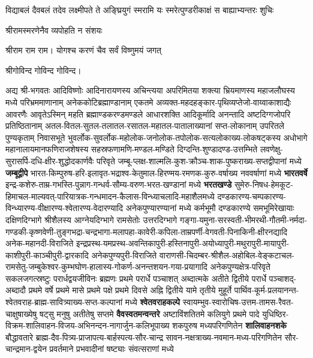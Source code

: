       {विद्याबलं दैवबलं तदेव लक्ष्मीपते ते अङ्घ्रियुगं स्मरामि}
    {यः स्मरेत्पुण्डरीकाक्षं स बाह्याभ्यन्तरः शुचिः}

{श्रीरामस्मरणेनैव व्यपोहति न संशयः}

श्रीराम राम राम। 
{योगश्च करणं चैव सर्वं विष्णुमयं जगत्}

श्रीगोविन्द गोविन्द गोविन्द। 

अद्य श्री-भगवतः आदिविष्णोः आदिनारायणस्य अचिन्त्यया अपरिमितया शक्त्या भ्रियमाणस्य महाजलौघस्य मध्ये
परिभ्रम\-माणानाम् अनेक\-कोटि\-ब्रह्माण्डानाम् एकतमे अव्यक्त-महदहङ्कार-पृथिव्यप्तेजो-वाय्वाकाशाद्यैः आवरणैः
आवृते\-ऽस्मिन् महति ब्रह्माण्डकरण्डमण्डले आधारशक्ति आदिकूर्मादि अनन्तादि अष्टदिग्गजोपरि
प्रतिष्ठितानाम् अतल-वितल-सुतल-तलातल-रसातल-महातल-पातालाख्यानां सप्त-लोकानाम् उपरितले
पुण्यकृताम् निवासभूते
भुवर्लोक-सुवर्लोक-महोलोक-जनोलोक-तपोलोक-सत्यलोकाख्य-लोकषट्कस्य अधोभागे महानालायमान\-फणि\-राज\-शेषस्य 
सहस्र\-फणामणि-मण्डल-मण्डिते दिग्दन्ति-शुण्डादण्ड-उत्तम्भिते 
लवणेक्षु-सुरासर्पि-दधि-क्षीर-शुद्धोदकार्णवैः परिवृते
जम्बू-प्लक्ष-शाल्मलि-कुश-क्रौञ्च-शाक-पुष्कराख्य-सप्तद्वीपानां मध्ये \textbf{जम्बूद्वीपे}
भारत-किम्पुरुष-हरि-इलावृत-भद्राश्व-केतुमाल-हिरण्मय-रमणक-कुरु-वर्षाख्य नववर्षाणां मध्ये \textbf{भारतवर्षे}
इन्द्र-कशेरु-ताम्र-गभस्ति-पुन्नाग-गन्धर्व-सौम्य-वरुण-भरत-खण्डानां मध्ये \textbf{भरतखण्डे}
सुमेरु-निषध-हेमकूट-हिमाचल-माल्यवत्-पारियात्रक-गन्धमादन-कैलास-विन्ध्याचलादि-महा\-शैल\-मध्ये
दण्डकारण्य-चम्पकारण्य-विन्ध्यारण्य-वीक्षारण्य-श्वेतारण्य-वेदारण्यादि अनेक\-पुण्या\-रण्यानां मध्ये
कर्मभूमौ दण्डकारण्ये समभूमिरेखायाः दक्षिणदिग्भागे श्रीशैलस्य आग्नेयदिग्भागे रामसेतोः उत्तर\-दिग्भागे
गङ्गा-यमुना-सरस्वती-भीमरथी-गौतमी-नर्मदा-गण्डकी-कृष्णवेणी-तुङ्गभद्रा-चन्द्रभागा-मलापहा-कावेरी-कपिला-ताम्रपर्णी-वेगवती-पिनाकिनी-क्षीरनद्यादि
अनेक-महानदी-विराजिते
इन्द्रप्रस्थ-यमप्रस्थ-अवन्तिका\-पुरी-हस्तिनापुरी-अयोध्या\-पुरी-मथुरा\-पुरी-मायापुरी-काशीपुरी-काञ्चीपुरी-द्वारकादि अनेक\-पुण्यपुरी-विराजिते
वाराणसी-चिदम्बर-श्रीशैल-अहोबिल-वेङ्कटाचल-रामसेतु-जम्बुकेश्वर-कुम्भघोण-हालास्य-गोकर्ण-अनन्तशयन-गया-प्रयागादि
अनेकपुण्यक्षेत्र-परिवृते सकलजगत्स्रष्टुः परार्धद्वयजीविनः ब्रह्मणः प्रथमे परार्धे पञ्चाशत्
अब्दात्मके अतीते द्वितीये परार्धे पञ्चाशद्-अब्दादौ प्रथमे वर्षे प्रथमे मासे प्रथमे पक्षे प्रथमे
दिवसे अह्नि द्वितीये यामे तृतीये मुहूर्ते
पार्थिव-कूर्म-प्रलयानन्त-श्वेतवराह-ब्राह्म-सावित्र्याख्य-सप्त-कल्पानां मध्ये \textbf{श्वेतवराहकल्पे}
स्वायम्भुव-स्वारोचिष-उत्तम-तामस-रैवत-चाक्षुषाख्येषु षट्सु मनुषु अतीतेषु सप्तमे \textbf{वैवस्वतमन्वन्तरे}
अष्टाविंशतितमे कलियुगे प्रथमे पादे युधिष्ठिर-विक्रम-शालिवाहन-विजय-अभिनन्दन-नागार्जुन-कलिभूपाख्य
शकपुरुष मध्यपरि\-गणितेन \textbf{शालिवाहनशके} बौद्धावतारे ब्राह्म-दैव-पित्र्य-प्राजापत्य-बार्हस्पत्य-सौर-चान्द्र
सावन-नक्षत्राख्य-नवमान-मध्य-परि\-गणितेन सौर-चान्द्रमान-द्वयेन प्रवर्तमाने प्रभवादीनां षष्ट्याः
संवत्सराणां मध्ये 
\yutithyadi

